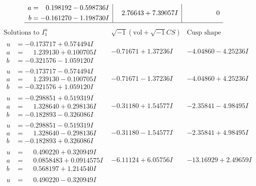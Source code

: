 \documentclass[1p]{elsarticle_modified}
\theoremstyle{definition}
\newcommand{\I}{\sqrt{-1}}
\begin{document}
$$\begin{array}{c|c|c}
\begin{aligned}
a &= \phantom{-}0.198192 - 0.598736 I \\
b &= -0.161270 - 1.198730 I\end{aligned}
 & \phantom{-}2.76643 + 7.39057 I & \phantom{-0.000000 } 0\\
 \hline 
 \end{array}$$\newpage$$\begin{array}{c|c|c}  
\text{Solutions to }I^u_{1}& \I (\text{vol} + \sqrt{-1}CS) & \text{Cusp shape}\\
 \hline 
\begin{aligned}
u &= -0.173717 + 0.574494 I \\
a &= \phantom{-}1.239130 + 0.100705 I \\
b &= -0.321576 - 1.059120 I\end{aligned}
 & -0.71671 + 1.37236 I & -4.04860 - 4.25236 I \\ \hline\begin{aligned}
u &= -0.173717 - 0.574494 I \\
a &= \phantom{-}1.239130 - 0.100705 I \\
b &= -0.321576 + 1.059120 I\end{aligned}
 & -0.71671 - 1.37236 I & -4.04860 + 4.25236 I \\ \hline\begin{aligned}
u &= -0.298851 + 0.519319 I \\
a &= \phantom{-}1.328640 + 0.298136 I \\
b &= -0.182893 - 0.326086 I\end{aligned}
 & -0.31180 + 1.54577 I & -2.35841 - 4.98495 I \\ \hline\begin{aligned}
u &= -0.298851 - 0.519319 I \\
a &= \phantom{-}1.328640 - 0.298136 I \\
b &= -0.182893 + 0.326086 I\end{aligned}
 & -0.31180 - 1.54577 I & -2.35841 + 4.98495 I \\ \hline\begin{aligned}
u &= \phantom{-}0.490220 + 0.320949 I \\
a &= \phantom{-}0.0858483 + 0.0914575 I \\
b &= \phantom{-}0.568197 + 1.214540 I\end{aligned}
 & -6.11124 + 6.05756 I & -13.16929 + 2.49659 I \\ \hline\begin{aligned}
u &= \phantom{-}0.490220 - 0.320949 I \\

\end{aligned}
\end{array}$$
\end{document}
